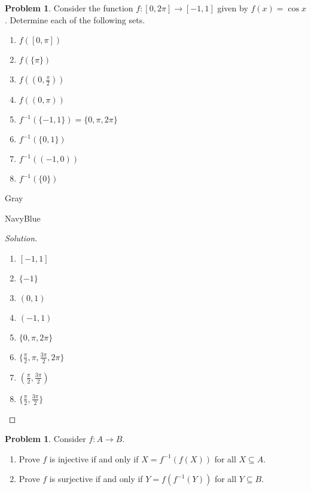 \documentclass[12pt]{amsart}
\newcounter{problem_number}[section]
\theoremstyle{named}
\newenvironment{soln}
{\begin{color}{Gray}\begin{framed}\begin{color}{NavyBlue}\begin{proof}[Solution]
\doublespacing}
{\end{proof}\end{color}\end{framed}\end{color}}
\theoremstyle{definition}
\newtheorem{problem}[proposition]{Problem}
\begin{document}
\begin{problem}
	Consider the function $f\colon [0,2\pi]\to [-1,1]$ given by $f(x) = \cos x$. Determine each of the following sets.
	\begin{enumerate}
		\item $f\left([0,\pi]\right)$
		\item $f\left(\{\pi\}\right)$
		\item $f\left((0,\frac{\pi}{2})\right)$
		\item $f\left((0,\pi)\right)$
		\item $f^{-1}\left(\{-1,1\}\right) = \{0,\pi,2\pi\}$
		\item $f^{-1}\left(\{0,1\}\right)$
		\item $f^{-1}\left((-1,0)\right)$
		\item $f^{-1}\left(\{0\}\right)$
	\end{enumerate}
\end{problem}

\begin{soln}
    \phantom{ }

    \begin{enumerate}
        \item $[-1,1]$
        \item $\{-1\}$
        \item $(0,1)$
        \item $(-1,1)$
        \item $\{0,\pi,2\pi\}$
        \item $\{\frac{\pi}{2},\pi,\frac{3\pi}{2},2\pi\}$
        \item $(\frac{\pi}{2},\frac{3\pi}{2})$
        \item $\{\frac{\pi}{2},\frac{3\pi}{2}\}$
    \end{enumerate}
\end{soln}

\vspace{20em}

\begin{problem}
	Consider $f\colon A\to B$.
	\begin{enumerate}
		\item Prove $f$ is injective if and only if $X = f^{-1}(f(X))$ for all $X\subseteq A$.
		\item Prove $f$ is surjective if and only if $Y=f(f^{-1}(Y))$ for all $Y\subseteq B$.
	\end{enumerate}
\end{problem}
\end{document}
